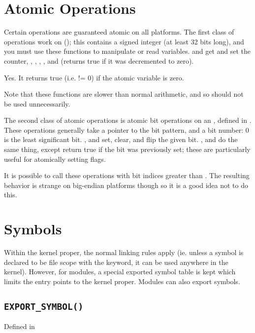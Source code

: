 \documentclass[a4paper,8pt,english]{sphinxmanual}
\begin{document}
\section{Atomic Operations}
\label{kernel-hacking/hacking:atomic-operations}
Certain operations are guaranteed atomic on all platforms. The first
class of operations work on  ();
this contains a signed integer (at least 32 bits long), and you must use
these functions to manipulate or read  variables.
 and  get and set
the counter, , ,
, , and
 (returns true if it was
decremented to zero).

Yes. It returns true (i.e. != 0) if the atomic variable is zero.

Note that these functions are slower than normal arithmetic, and so
should not be used unnecessarily.

The second class of atomic operations is atomic bit operations on an
, defined in . These
operations generally take a pointer to the bit pattern, and a bit
number: 0 is the least significant bit. ,
 and  set, clear,
and flip the given bit. ,
 and
 do the same thing, except return
true if the bit was previously set; these are particularly useful for
atomically setting flags.

It is possible to call these operations with bit indices greater than
. The resulting behavior is strange on big-endian
platforms though so it is a good idea not to do this.


\section{Symbols}
\label{kernel-hacking/hacking:symbols}
Within the kernel proper, the normal linking rules apply (ie. unless a
symbol is declared to be file scope with the  keyword, it can
be used anywhere in the kernel). However, for modules, a special
exported symbol table is kept which limits the entry points to the
kernel proper. Modules can also export symbols.


\subsection{\texttt{EXPORT\_SYMBOL()}}
\label{kernel-hacking/hacking:export-symbol}
Defined in 
\end{document}
